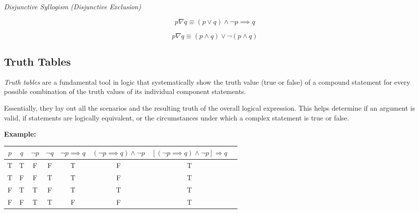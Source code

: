 \emph{Disjunctive Syllogism (Disjunctive Exclusion)}

\[
	p \nabla q \equiv (p \lor q) \land \neg p \implies q
\]

\[
	p \nabla q \equiv(p \land q) \lor \neg  (p \land q)
\]

\subsection{Truth Tables}

\emph{Truth tables} are a fundamental tool in logic that systematically show the truth value
(true or false) of a compound statement for every possible combination of the truth values of 
its individual component statements.
\vspace{\baselineskip}

Essentially, they lay out all the scenarios and the resulting truth of the overall logical expression.
This helps determine if an argument is valid, if statements are logically equivalent, or the circumstances
under which a complex statement is true or false.
\vspace{\baselineskip}

\textbf{Example:}
\vspace{\baselineskip}

\begin{center}
	\begin{tabular}{|c|c|c|c|c|c|c|c|}
		\hline
		\(p\) & \(q\) & \(\neg p\) & \(\neg q\) & \(\neg p \implies q\) & \((\neg p \implies q) \land \neg p\) & \(\left[(\neg p \implies q) \land \neg p\right] \Rightarrow q\) \\
		\hline
		T   & T   & F        & F        & T                      & F                                     & T                                                                \\
		T   & F   & F        & T        & T                      & F                                     & T                                                                \\
		F   & T   & T        & F        & T                      & T                                     & T                                                                \\
		F   & F   & T        & T        & F                      & F                                     & T                                                                \\
		\hline
	\end{tabular}
\end{center}

